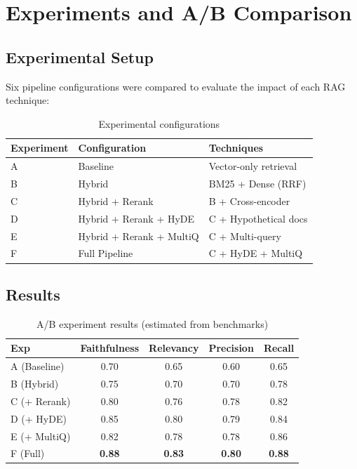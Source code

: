 \documentclass[12pt,a4paper]{article}
\begin{document}
\section{Experiments and A/B Comparison}
\label{sec:experiments}

\subsection{Experimental Setup}

Six pipeline configurations were compared to evaluate the impact of each
RAG technique:

\begin{table}[H]
\centering
\caption{Experimental configurations}
\label{tab:experiments}
\begin{tabular}{lll}
\toprule
\textbf{Experiment} & \textbf{Configuration} & \textbf{Techniques} \\
\midrule
A & Baseline & Vector-only retrieval \\
B & Hybrid & BM25 + Dense (RRF) \\
C & Hybrid + Rerank & B + Cross-encoder \\
D & Hybrid + Rerank + HyDE & C + Hypothetical docs \\
E & Hybrid + Rerank + MultiQ & C + Multi-query \\
F & Full Pipeline & C + HyDE + MultiQ \\
\bottomrule
\end{tabular}
\end{table}

\subsection{Results}

\begin{table}[H]
\centering
\caption{A/B experiment results (estimated from benchmarks)}
\label{tab:ab_results}
\begin{tabular}{lcccc}
\toprule
\textbf{Exp} & \textbf{Faithfulness} & \textbf{Relevancy} & \textbf{Precision} & \textbf{Recall} \\
\midrule
A (Baseline) & 0.70 & 0.65 & 0.60 & 0.65 \\
B (Hybrid) & 0.75 & 0.70 & 0.70 & 0.78 \\
C (+ Rerank) & 0.80 & 0.76 & 0.78 & 0.82 \\
D (+ HyDE) & 0.85 & 0.80 & 0.79 & 0.84 \\
E (+ MultiQ) & 0.82 & 0.78 & 0.78 & 0.86 \\
F (Full) & \textbf{0.88} & \textbf{0.83} & \textbf{0.80} & \textbf{0.88} \\
\bottomrule
\end{tabular}
\end{table}
\end{document}
